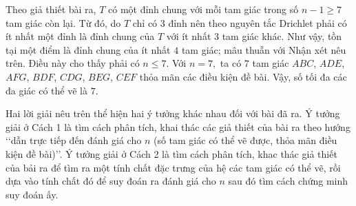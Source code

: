 \begin{bt}
{		Theo giả thiết bài ra, $T$ có một đỉnh chung với mỗi tam giác trong số $n-1\geq 7$ tam giác còn lại. 
		Từ đó, do $T$ chỉ có $3$ đỉnh nên theo nguyên tắc Drichlet phải có ít nhất một đỉnh là đỉnh chung của $T$ với ít nhất $3$ tam giác khác. Như vậy, tồn tại một điểm là đỉnh chung của ít nhất $4$ tam giác; mâu thuẫn với Nhận xét nêu trên. Điều này cho thấy phải có $n\leq 7.$
		Với $n=7,$ ta có $7$ tam giác $ABC$, $ADE$, $AFG$, $BDF$, $CDG$, $BEG$, $CEF$ thỏa mãn các điều kiện đề bài. Vậy, số tối đa các đa giác có thể vẽ là $7.$
		\begin{nx}
			Hai lời giải nêu trên thể hiện hai ý tưởng khác nhau đối với bài đã ra.  Ý tưởng giải ở Cách 1 là tìm cách phân tích, khai thác các giả thiết của bài ra theo hướng \lq\lq dẫn trực tiếp đến đánh giá cho $n$ (số tam giác có thể vẽ được, thỏa mãn điều kiện đề bài)\rq\rq . Ý tưởng giải ở Cách 2 là tìm cách phân tích, khac thác giả thiết của bải ra để tìm ra một tính chất đặc trưng của hệ các tam giác có thể vẽ, rồi dựa vào tính chất đó để suy đoán ra đánh giá cho $n$ sau đó tìm cách chứng minh suy đoán ấy.
			
		\end{nx}
	}
	
\end{bt}
